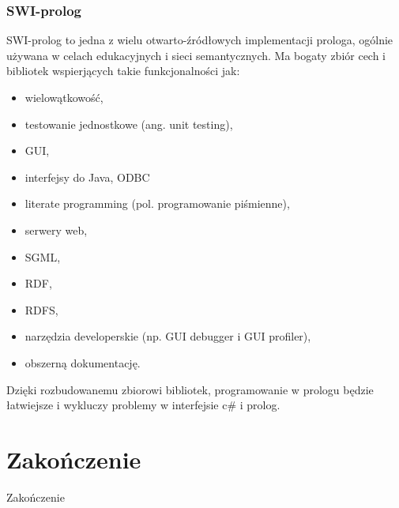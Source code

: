 \documentclass[a4paper]{article}
\begin{document}
    \subsubsection{SWI-prolog}
        SWI-prolog to jedna z wielu otwarto-źródłowych implementacji prologa,
        ogólnie używana w celach edukacyjnych i sieci semantycznych. Ma bogaty
        zbiór cech i bibliotek wspierjących takie funkcjonalności jak:
        \begin{itemize}
            \item wielowątkowość,
            \item testowanie jednostkowe (ang. unit testing),
            \item GUI,
            \item interfejsy do Java, ODBC
            \item literate programming (pol. programowanie piśmienne),
            \item serwery web,
            \item SGML,
            \item RDF,
            \item RDFS,
            \item narzędzia developerskie (np. GUI debugger i GUI profiler),
            \item obszerną dokumentację.

        \end{itemize}

        Dzięki rozbudowanemu zbiorowi bibliotek, programowanie w prologu
        będzie łatwiejsze i wykluczy problemy w interfejsie c\# i prolog.

\section{Zakończenie}
	Zakończenie
\end{document}
